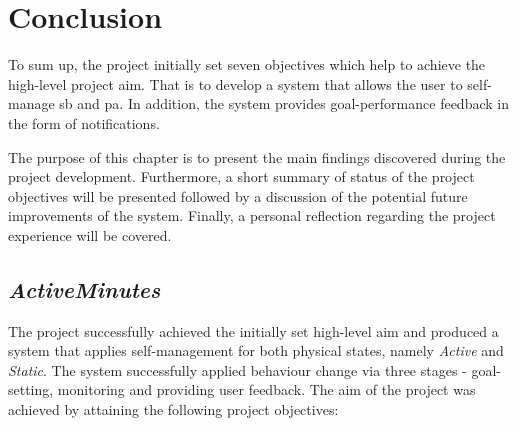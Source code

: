 \chapter{Conclusion}
To sum up, the project initially set seven objectives which help to achieve the high-level project aim. That is to develop a system that allows the user to self-manage \gls{sb} and \gls{pa}. In addition, the system provides goal-performance feedback in the form of notifications. 

The purpose of this chapter is to present the main findings discovered during the project development. Furthermore, a short summary of status of the project objectives will be presented followed by a discussion of the potential future improvements of the system. Finally, a personal reflection regarding the project experience will be covered. 

\section{\textit{ActiveMinutes}}
The project successfully achieved the initially set high-level aim and produced a system that applies self-management for both physical states, namely \textit{Active} and \textit{Static}. The system successfully applied behaviour change via three stages - goal-setting, monitoring and providing user feedback. The aim of the project was achieved by attaining the following project objectives:

